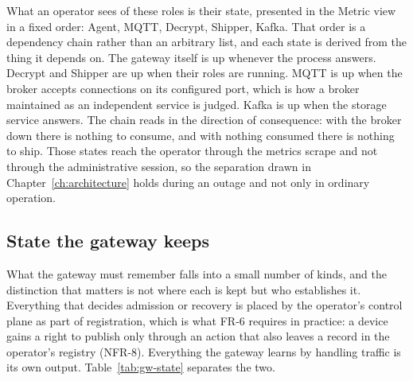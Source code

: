 \documentclass[12pt,a4paper]{report}
\begin{document}
What an operator sees of these roles is their state, presented in
the Metric view in a fixed order: Agent, MQTT, Decrypt, Shipper,
Kafka. That order is a dependency chain rather than an arbitrary
list, and each state is derived from the thing it depends on. The
gateway itself is up whenever the process answers. Decrypt
and Shipper are up when their roles are running. MQTT is up when the
broker accepts connections on its configured port, which is how a
broker maintained as an independent service is judged. Kafka is up
when the storage service answers. The chain reads in the direction
of consequence: with the broker down there is nothing to consume,
and with nothing consumed there is nothing to ship. Those states
reach the operator through the metrics scrape and not through the
administrative session, so the separation drawn in
Chapter~\ref{ch:architecture} holds during an outage and not only in
ordinary operation.

\subsection{State the gateway keeps}
\label{sec:gw-state}

What the gateway must remember falls into a small number of kinds,
and the distinction that matters is not where each is kept but who
establishes it. Everything that decides admission or recovery is
placed by the operator's control plane as part of registration,
which is what FR-6 requires in practice: a device gains a right to
publish only through an action that also leaves a record in the
operator's registry (NFR-8). Everything the gateway learns by
handling traffic is its own output. Table~\ref{tab:gw-state}
separates the two.
\end{document}
